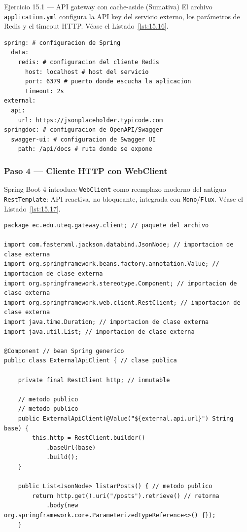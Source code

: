 \begin{cajaejercicio}{Ejercicio 15.1 --- API gateway con cache-aside (Sumativa)}
El archivo \texttt{application.yml} configura la API key
del servicio externo, los parámetros de Redis y el timeout HTTP. V\'ease el Listado~\ref{lst:15.16}.


\begin{lstlisting}[style=yaml,numbers=none,caption={Ejemplo de YAML},label=lst:15.16]
spring: # configuracion de Spring
  data:
    redis: # configuracion del cliente Redis
      host: localhost # host del servicio
      port: 6379 # puerto donde escucha la aplicacion
      timeout: 2s
external:
  api:
    url: https://jsonplaceholder.typicode.com
springdoc: # configuracion de OpenAPI/Swagger
  swagger-ui: # configuracion de Swagger UI
    path: /api/docs # ruta donde se expone
\end{lstlisting}

\subsubsection*{Paso 4 --- Cliente HTTP con WebClient}

Spring Boot 4 introduce \texttt{WebClient} como reemplazo
moderno del antiguo \texttt{RestTemplate}: API reactiva, no
bloqueante, integrada con \texttt{Mono}/\texttt{Flux}. V\'ease el Listado~\ref{lst:15.17}.


\begin{lstlisting}[style=java,caption={ExternalApiClient.java},label=lst:15.17]
package ec.edu.uteq.gateway.client; // paquete del archivo

import com.fasterxml.jackson.databind.JsonNode; // importacion de clase externa
import org.springframework.beans.factory.annotation.Value; // importacion de clase externa
import org.springframework.stereotype.Component; // importacion de clase externa
import org.springframework.web.client.RestClient; // importacion de clase externa
import java.time.Duration; // importacion de clase externa
import java.util.List; // importacion de clase externa

@Component // bean Spring generico
public class ExternalApiClient { // clase publica

    private final RestClient http; // inmutable

    // metodo publico
    // metodo publico
    public ExternalApiClient(@Value("${external.api.url}") String base) {
        this.http = RestClient.builder()
            .baseUrl(base)
            .build();
    }

    public List<JsonNode> listarPosts() { // metodo publico
        return http.get().uri("/posts").retrieve() // retorna
            .body(new org.springframework.core.ParameterizedTypeReference<>() {});
    }


\end{lstlisting}
\end{cajaejercicio}

